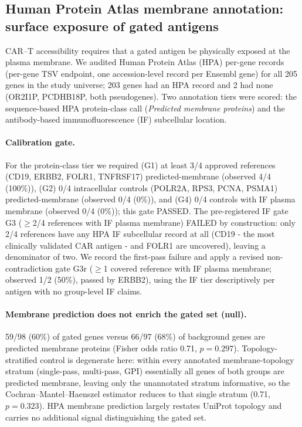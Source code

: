 \subsection{Human Protein Atlas membrane annotation: surface exposure of gated antigens}
\label{sec:hpa}
CAR--T accessibility requires that a gated antigen be physically exposed at
the plasma membrane. We audited Human Protein Atlas (HPA) per-gene records
(per-gene TSV endpoint, one accession-level record per Ensembl gene) for all
205 genes in the study universe; 203 genes had an HPA record and
2 had none (OR2I1P, PCDHB18P, both pseudogenes). Two annotation tiers were
scored: the sequence-based HPA protein-class call (\emph{Predicted membrane
proteins}) and the antibody-based immunofluorescence (IF) subcellular
location.

\paragraph{Calibration gate.} For the protein-class tier we required (G1) at
least 3/4 approved references (CD19, ERBB2, FOLR1, TNFRSF17)
predicted-membrane (observed 4/4 (100\%)), (G2) 0/4 intracellular controls
(POLR2A, RPS3, PCNA, PSMA1) predicted-membrane (observed 0/4 (0\%)), and
(G4) 0/4 controls with IF plasma membrane (observed 0/4 (0\%)); this gate
PASSED. The pre-registered IF gate G3 ($\geq$2/4 references with IF plasma
membrane) FAILED by construction: only 2/4 references have any HPA IF
subcellular record at all (CD19 - the most clinically validated CAR antigen
- and FOLR1 are uncovered), leaving a denominator of two. We record the
first-pass failure and apply a revised non-contradiction gate G3r ($\geq$1
covered reference with IF plasma membrane; observed 1/2 (50\%), passed by
ERBB2), using the IF tier descriptively per antigen with no group-level IF
claims.

\paragraph{Membrane prediction does not enrich the gated set (null).}
59/98 (60\%) of gated genes versus 66/97 (68\%) of background genes are predicted
membrane proteins (Fisher odds ratio 0.71, $p=0.297$).
Topology-stratified control is degenerate here: within every annotated
membrane-topology stratum (single-pass, multi-pass, GPI) essentially all
genes of both groups are predicted membrane, leaving only the unannotated
stratum informative, so the Cochran--Mantel--Haenszel estimator reduces to
that single stratum (0.71, $p=0.323$). HPA membrane prediction largely
restates UniProt topology and carries no additional signal distinguishing
the gated set.

